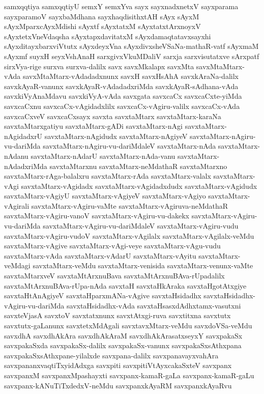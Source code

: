 {samxqqtiya
samxqqtiyU
semxY
semxYva
sayx
sayxnadxnetxV
sayxparama
sayxparamoV
sayxbaMdhana
sayxhaqdisithxtAH
sAyx
sAyxM
sAyxMparxcAyxMdishi
sAyxtf
sAyxtatxM
sAyxtatxtArxnoyxV
sAyxtetxVneVdaqsha
sAyxtapxdavitatxM
sAyxdamaqtatavxsayxhi
sAyxditayxbarxviVtutx
sAyxdeyxVna
sAyxdivxsheVSaNa-mathaR-vatf
sAyxmaM
sAyxmf
suyxH
seyxVshAnaH
sarxgivxVkuMDaliV
sarxja
sarxvisutatxve
sArxpatf
sirxVya-rige
surxva
surxva-dalilx
savx
savxMkalapx
savxMta
savxMtaMtarx-vAda
savxMtaMtarx-vAdadadxnunx
savxH
savxHsAhA
savxkAraNa-dalilx
savxkAyaR-vanunx
savxkAyaR-vAdadadxriMda
savxkAyaR-sAdhana-vAda
savxkiVyAnaMdavu
savxkiVyA-vAda
savxgata
savxcaCx
savxcaCxte-yiMda
savxcaCxnu
savxcaCx-vAgidadxlilx
savxcaCx-vAgiru-valilx
savxcaCx-vAda
savxcaCxveV
savxcaCxsayx
savxta
savxtaMtarx
savxtaMtarx-karaNa
savxtaMtarxgatiyu
savxtaMtarx-gADi
savxtaMtarx-nAgi
savxtaMtarx-nAgidadxrU
savxtaMtarx-nAgidudx
savxtaMtarx-nAgiyeV
savxtaMtarx-nAgiru-vu-dariMda
savxtaMtarx-nAgiru-vu-dariMdaleV
savxtaMtarx-nAda
savxtaMtarx-nAdanu
savxtaMtarx-nAdarU
savxtaMtarx-nAda-vanu
savxtaMtarx-nAdadxriMda
savxtaMtarxnu
savxtaMtarx-neMdathaR
savxtaMtarxno
savxtaMtarx-rAga-balalxru
savxtaMtarx-rAda
savxtaMtarx-valalx
savxtaMtarx-vAgi
savxtaMtarx-vAgidadx
savxtaMtarx-vAgidadxdudx
savxtaMtarx-vAgidudx
savxtaMtarx-vAgiyU
savxtaMtarx-vAgiyeV
savxtaMtarx-vAgiyo
savxtaMtarx-vAgirali
savxtaMtarx-vAgiru-vaMte
savxtaMtarx-vAgiruva-neMdathaR
savxtaMtarx-vAgiru-vanoV
savxtaMtarx-vAgiru-vu-dakekx
savxtaMtarx-vAgiru-vu-dariMda
savxtaMtarx-vAgiru-vu-dariMdaleV
savxtaMtarx-vAgiru-vudu
savxtaMtarx-vAgiru-vudoV
savxtaMtarx-vAgilalx
savxtaMtarx-vAgilalx-veMdu
savxtaMtarx-vAgive
savxtaMtarx-vAgi-veye
savxtaMtarx-vAgu-vudu
savxtaMtarx-vAda
savxtaMtarx-vAdarU
savxtaMtarx-vAyitu
savxtaMtarx-veMdagi
savxtaMtarx-veMdu
savxtaMtarx-venisida
savxtaMtarx-venunx-vaMte
savxtaMtarxveV
savxtaMtArxnuBava
savxtaMtArxnuBAva-rUpadalilx
savxtaMtArxnuBAva-rUpa-nAda
savxtaH
savxtaHkAraka
savxtaHgotAtxgiye
savxtaHtAnAgiyeV
savxtaHparxmANa-vAgive
savxtaHsidadhx
savxtaHsidadhx-vAgiru-vu-dariMda
savxtaHsidadhx-vAda
savxtaHsasxdAdhxtamx-vasutxni
savxteVjasA
savxtoV
savxtatxnunx
savxtAtxgi-ruva
savxtitxna
savxtutx
savxtutx-gaLanunx
savxtetxMdAgali
savxtavxMtarx-veMdu
savxdoVSa-veMdu
savxdhA
savxdhAkAra
savxdhAkAraM
savxdhAkArasatxseyxY
savxpakaSx
savxpakaSxda
savxpakaSx-dalilx
savxpakaSx-vanunx
savxpakaSxsAthxpana
savxpakaSxsAthxpane-yilalxde
savxpana-dalilx
savxpanavayxvahAra
savxpananxvaqtiTxyidAdxga
savxpiti
savxpitiVtAyxcakaSxteV
savxpanx
savxpanxM
savxpanxMpashayxti
savxpanx-kamaR-gaLa
savxpanx-kamaR-gaLu
savxpanx-kANuTiTxdedxV-neMdu
savxpanxkAyaRM
savxpanxkAyaRvu
}
